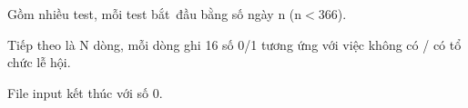 Gồm nhiều test, mỗi test bắt đầu bằng số ngày n (n$<$366).

Tiếp theo là N dòng, mỗi dòng ghi 16 số 0/1 tương ứng với việc không có / có tổ chức lễ hội.

File input kết thúc với số 0.

\